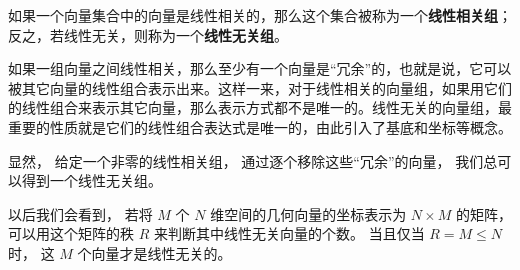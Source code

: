 如果一个向量集合中的向量是线性相关的，那么这个集合被称为一个\textbf{线性相关组}；反之，若线性无关，则称为一个\textbf{线性无关组}。

如果一组向量之间线性相关，那么至少有一个向量是“冗余”的，也就是说，它可以被其它向量的线性组合表示出来。这样一来，对于线性相关的向量组，如果用它们的线性组合来表示其它向量，那么表示方式都不是唯一的。线性无关的向量组，最重要的性质就是它们的线性组合表达式是唯一的，由此引入了基底和坐标等概念。

显然， 给定一个非零的线性相关组， 通过逐个移除这些“冗余”的向量， 我们总可以得到一个线性无关组。

以后我们会看到， 若将 $M$ 个 $N$ 维空间的几何向量的坐标表示为 $N\times M$ 的矩阵， 可以用这个矩阵的秩 $R$ 来判断其中线性无关向量的个数。 当且仅当 $R = M \leqslant N$ 时， 这 $M$ 个向量才是线性无关的。
